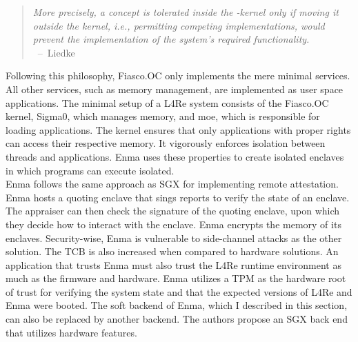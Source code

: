 \begin{quote}
    \textit{ More precisely, a concept is tolerated inside the \mu-kernel only
        if moving it outside the kernel, i.e., permitting competing
        implementations, would prevent the implementation of the system's
        required functionality. \\
    } \mbox{ -- Liedke\cite{liedtke1995micro}}
\end{quote}


Following this philosophy, Fiasco.OC only implements the mere minimal services.
All other services, such as memory management, are implemented as user space
applications. The minimal setup of a L4Re system consists of the Fiasco.OC
kernel, Sigma0, which manages memory, and moe, which is responsible for loading
applications. The kernel ensures that only applications with proper rights can
access their respective memory. It vigorously enforces isolation between threads
and applications. Enma uses these properties to create isolated enclaves in
which programs can execute isolated.\\

Enma follows the same approach as SGX for implementing remote attestation. Enma
hosts a quoting enclave that sings reports to verify the state of an enclave.
The appraiser can then check the signature of the quoting enclave, upon which
they decide how to interact with the enclave. Enma encrypts the memory of its
enclaves. Security-wise, Enma is vulnerable to side-channel attacks as the other
solution. The TCB is also increased when compared to hardware solutions. An
application that trusts Enma must also trust the L4Re runtime environment as
much as the firmware and hardware. Enma utilizes a TPM as the hardware root of
trust for verifying the system state and that the expected versions of L4Re and
Enma were booted. The soft backend of Enma, which I described in this
section, can also be replaced by another backend. The authors propose an SGX
back end that utilizes hardware features.

